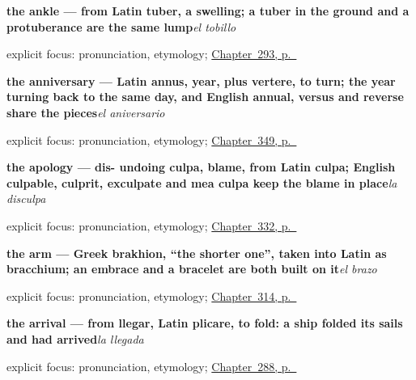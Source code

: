 \noindent\begin{minipage}[t]{\linewidth}
\raggedright
\textbf{the ankle — from Latin tuber, a swelling; a tuber in the ground and a protuberance are the same lump}\enspace\emph{el tobillo}\par
\footnotesize explicit focus: pronunciation, etymology; \hyperref[ch:mas-del-cuerpo]{Chapter~293, p.~\pageref*{ch:mas-del-cuerpo}}
\end{minipage}\par\smallskip

\noindent\begin{minipage}[t]{\linewidth}
\raggedright
\textbf{the anniversary — Latin annus, year, plus vertere, to turn; the year turning back to the same day, and English annual, versus and reverse share the pieces}\enspace\emph{el aniversario}\par
\footnotesize explicit focus: pronunciation, etymology; \hyperref[ch:la-jornada-y-la-decada]{Chapter~349, p.~\pageref*{ch:la-jornada-y-la-decada}}
\end{minipage}\par\smallskip

\noindent\begin{minipage}[t]{\linewidth}
\raggedright
\textbf{the apology — dis- undoing culpa, blame, from Latin culpa; English culpable, culprit, exculpate and mea culpa keep the blame in place}\enspace\emph{la disculpa}\par
\footnotesize explicit focus: pronunciation, etymology; \hyperref[ch:permiso-y-voz]{Chapter~332, p.~\pageref*{ch:permiso-y-voz}}
\end{minipage}\par\smallskip

\noindent\begin{minipage}[t]{\linewidth}
\raggedright
\textbf{the arm — Greek brakhion, \textquotedblleft{}the shorter one\textquotedblright{}, taken into Latin as bracchium; an embrace and a bracelet are both built on it}\enspace\emph{el brazo}\par
\footnotesize explicit focus: pronunciation, etymology; \hyperref[ch:brazo-y-pie]{Chapter~314, p.~\pageref*{ch:brazo-y-pie}}
\end{minipage}\par\smallskip

\noindent\begin{minipage}[t]{\linewidth}
\raggedright
\textbf{the arrival — from llegar, Latin plicare, to fold: a ship folded its sails and had arrived}\enspace\emph{la llegada}\par
\footnotesize explicit focus: pronunciation, etymology; \hyperref[ch:la-partida]{Chapter~288, p.~\pageref*{ch:la-partida}}
\end{minipage}\par\smallskip

